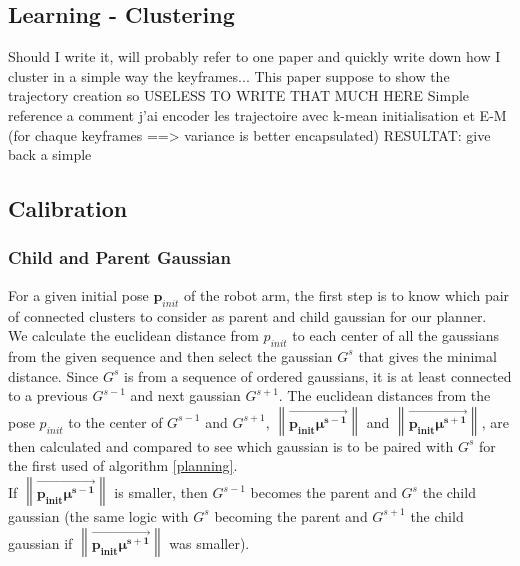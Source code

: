 \documentclass[letterpaper, 10 pt, conference]{ieeeconf}  %
\newcommand{\mb}[1]{{\boldsymbol{#1}}}
\newcommand\norm[1]{\left\lVert#1\right\rVert}
\begin{document}
\subsection{Learning - Clustering}
Should I write it, will probably refer to one paper and quickly write down how I cluster in a simple way the keyframes...
This paper suppose to show the trajectory creation so USELESS TO WRITE THAT MUCH HERE
Simple reference a comment j'ai encoder les trajectoire avec k-mean initialisation et E-M  (for chaque keyframes ==> variance is better encapsulated)
RESULTAT:
give back a simple 
\subsection{Calibration}
\subsubsection{Child and Parent Gaussian}\leavevmode\par
For a given initial pose $\mb{p}_{init}$ of the robot arm, the first step is to know which pair of connected clusters to consider as parent and child gaussian for our planner.\\
We calculate the euclidean distance from $p_{init}$ to each center of all the gaussians from the given sequence and then select the gaussian $G^s$ that gives the minimal distance.
Since $G^{s}$ is from a sequence of ordered gaussians, it is at least connected to a previous $G^{s-1}$ and next gaussian $G^{s+1}$.  The euclidean distances from the pose $p_{init}$ to the center of $G^{s-1}$ and $G^{s+1}$, $\norm{\overrightarrow{\mb{p_{init}}\mb{\mu^{s-1}}}}$ and $\norm{\overrightarrow{\mb{p_{init}}\mb{\mu^{s+1}}}}$, are then calculated and compared to see which gaussian is to be paired with $G^s$ for the first used of algorithm \ref{planning}.\\
If $\norm{\overrightarrow{\mb{p_{init}}\mb{\mu^{s-1}}}}$ is smaller, then $G^{s-1}$ becomes the parent and $G^{s}$ the child gaussian (the same logic with  $G^{s}$ becoming the parent and $G^{s+1}$ the child gaussian if $\norm{\overrightarrow{\mb{p_{init}}\mb{\mu^{s+1}}}}$ was smaller).\\
\end{document}
